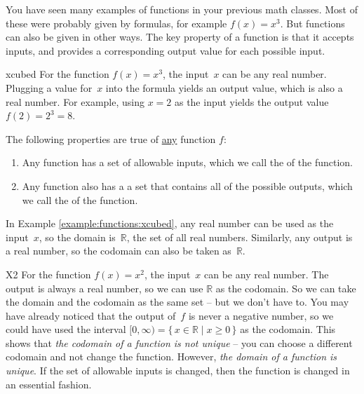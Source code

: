 You have seen many examples of functions in your previous math classes. 
Most of these were probably given by formulas, for example $f(x) = x^3$. 
But functions can also be given in other ways. The key property of a function
is that it accepts inputs, and provides a corresponding output value for each possible input.

\begin{example}{xcubed}
 For the function $f(x) = x^3$, the input~$x$ can be any real number.
Plugging a value for~$x$ into the formula yields an output value,
which is also a real number. For example, using $x = 2$ as the input
yields the output value $f(2) = 2^3 = 8$.
\end{example}

\medskip
The following properties are true of \underline{any} function $f$:
\begin{enumerate}
\item Any function has a  set of allowable inputs, which we call the  of the function.
\item Any function also has a a set that contains all of the
possible outputs, which we call the  of the function.
\end{enumerate}

In Example \ref{example:functions:xcubed}, any real number can be used as the input~$x$, so the domain is~$\mathbb{R}$,
the set of all real numbers. Similarly, any output is a real number, so the codomain can also be taken as~$\mathbb{R}$.

\begin{example}{X2}
 For the function $f(x) = x^2$, the input~$x$ can be any real number.
The output is always a real number, 
so we can use $\mathbb{R}$ as the codomain. So we can take the domain
and the codomain as the same set -- but we don't have to. 
You may have already noticed that the output of~$f$ is never a negative number,
so we could have used the interval $[0,\infty) = \{\, x \in \mathbb{R} \mid x \ge 0 \,\}$ as the codomain.
This shows that \emph{the codomain of a function is not unique} -- you can choose a different codomain and not change the function.
However, \emph{the domain of a function is unique}. If the set of allowable inputs is changed, then the function is changed in an essential fashion.
\end{example}

